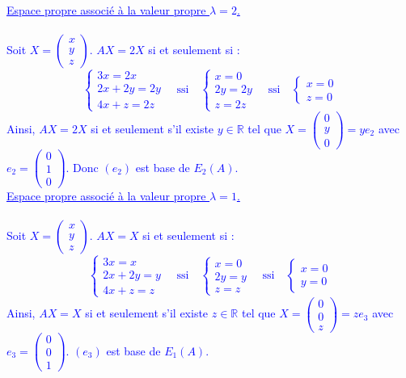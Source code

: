 \documentclass[a4paper,12pt]{article}
\begin{document}
\textcolor{blue}{
\underline{Espace propre associé à la valeur propre $\lambda = 2$.} \\ \\
Soit $X =
\begin{pmatrix}
x \\
y \\
z
\end{pmatrix}
$. $AX = 2X$ si et seulement si :
\[
\begin{cases}
3x = 2x \\
2x + 2y = 2y \\
4x + z = 2z
\end{cases}
\quad \text{ssi} \quad
\begin{cases}
x = 0 \\
2y = 2y \\
z = 2z
\end{cases}
\quad \text{ssi} \quad
\begin{cases}
x = 0 \\
z = 0
\end{cases}
\]
Ainsi, $AX = 2X$ si et seulement s'il existe $y \in \mathbb{R}$ tel que $X =
\begin{pmatrix}
0 \\
y \\
0
\end{pmatrix} = y e_2
$ avec $e_2 =
\begin{pmatrix}
0 \\
1 \\
0
\end{pmatrix}$.
Donc $(e_2)$ est base de $E_2(A)$.} \\

\textcolor{blue}{ 
\underline{Espace propre associé à la valeur propre $\lambda = 1$.} \\ \\
Soit $X =
\begin{pmatrix}
x \\
y \\
z
\end{pmatrix}
$. $AX=X$ si et seulement si :
\[
\begin{cases}
3x = x \\
2x + 2y = y \\
4x + z = z
\end{cases}
\quad \text{ssi} \quad
\begin{cases}
x = 0 \\
2y = y \\
z = z
\end{cases}
\quad \text{ssi} \quad
\begin{cases}
x = 0 \\
y = 0
\end{cases}
\]
Ainsi, $AX=X$ si et seulement s'il existe $z \in \mathbb{R}$ tel que $X =
\begin{pmatrix}
0 \\
0 \\
z
\end{pmatrix} = z e_3
$ avec $e_3 =
\begin{pmatrix}
0 \\
0 \\
1
\end{pmatrix}$. $(e_3)$ est base de $E_1(A)$.
} \\
\end{document}
